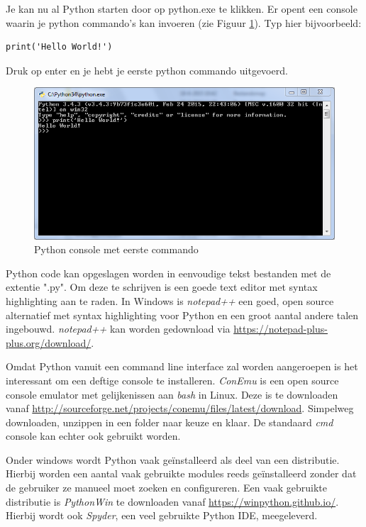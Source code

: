 \documentclass[11pt,twoside]{article}
\begin{document}
Je kan nu al Python starten door op python.exe te klikken. Er opent een console waarin je python commando's kan invoeren (zie Figuur \ref{fig:Python34}). Typ hier bijvoorbeeld:
\begin{lstlisting}
print('Hello World!')
\end{lstlisting}

Druk op enter en je hebt je eerste python commando uitgevoerd.
\begin{figure}[ht]
	\centering
	\includegraphics[scale=0.5]{fig/Python34}
	\caption{Python console met eerste commando}
	\label{fig:Python34}
\end{figure}

Python code kan opgeslagen worden in eenvoudige tekst bestanden met de extentie "\textsf{.py}". Om deze te schrijven is een goede text editor met syntax highlighting aan te raden. In Windows is \emph{notepad++} een goed, open source alternatief met syntax highlighting voor Python en een groot aantal andere talen ingebouwd. \emph{notepad++} kan worden gedownload via \url{https://notepad-plus-plus.org/download/}.

Omdat Python vanuit een command line interface zal worden aangeroepen is het interessant om een deftige console te installeren. \emph{ConEmu} is een open source console emulator met gelijkenissen aan \emph{bash} in Linux. Deze is te downloaden vanaf \url{http://sourceforge.net/projects/conemu/files/latest/download}. Simpelweg downloaden, unzippen in een folder naar keuze en klaar. De standaard \emph{cmd} console kan echter ook gebruikt worden.

Onder windows wordt Python vaak geïnstalleerd als deel van een distributie. Hierbij worden een aantal vaak gebruikte modules reeds geïnstalleerd zonder dat de gebruiker ze manueel moet zoeken en configureren. Een vaak gebruikte distributie is \emph{PythonWin} te downloaden vanaf \url{https://winpython.github.io/}. Hierbij wordt ook \emph{Spyder}, een veel gebruikte Python IDE, meegeleverd.
\end{document}
